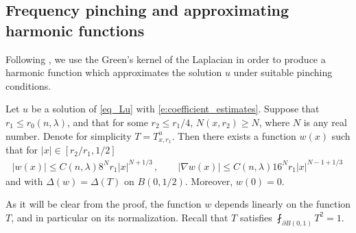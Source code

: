 \documentclass[11pt]{article}
\begin{document}
\subsection{Frequency pinching and approximating harmonic functions}
Following \cite{han_sing}, we use the Green's kernel of the Laplacian in order to produce a harmonic function which approximates the solution $u$ under suitable pinching conditions.

\begin{theorem}\label{th_w}
 Let $u$ be a solution of \eqref{eq_Lu} with \eqref{e:coefficient_estimates}. Suppose that $r_1\leq r_0(n,\lambda)$, and that for some $r_2\leq r_1/4$, $N(x,r_2)\geq N$, where $N$ is any real number. Denote for simplicity $T=T^u_{x,r_1}$. Then there exists a function $w(x)$ such that for ${\left|x\right|} \in [r_2/r_1,1/2]$ 
 \begin{gather}\label{eq_w0}
  {\left|{w(x)}\right|}\leq C(n,\lambda) 8^N r_1 {\left|x\right|} ^{N+1/3}\, , \quad \quad {\left|{\nabla w (x)}\right|} \leq C(n,\lambda) 16^N r_1 {\left|x\right|} ^{N-1+1/3}\, 
 \end{gather}
 and with $\Delta (w) = \Delta (T)$ on $B(0,1/2)$. Moreover, $w(0)=0$.
\end{theorem}
\begin{remark}
 As it will be clear from the proof, the function $w$ depends linearly on the function $T$, and in particular on its normalization. Recall that $T$ satisfies $\fint_{\partial B(0,1)} T^2 =1$.
\end{remark}
\end{document}
